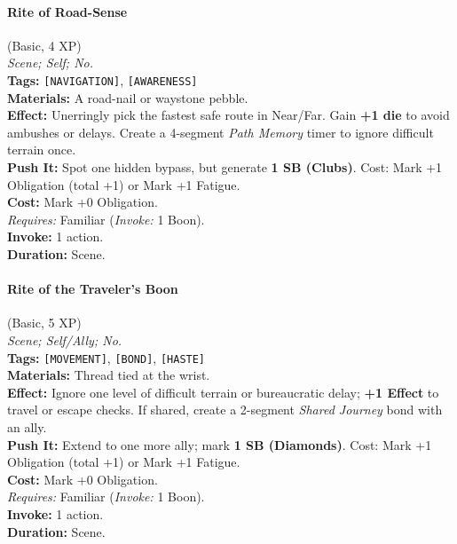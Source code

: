 \paragraph{Rite of Road-Sense} (Basic, 4 XP) \hfill \\
\emph{Scene; Self; No.} \\
\textbf{Tags:} \texttt{[NAVIGATION]}, \texttt{[AWARENESS]} \\
\textbf{Materials:} A road-nail or waystone pebble. \\
\textbf{Effect:} Unerringly pick the fastest safe route in Near/Far. Gain \textbf{+1 die} to avoid ambushes or delays. Create a 4-segment \textit{Path Memory} timer to ignore difficult terrain once. \\
\textbf{Push It:} Spot one hidden bypass, but generate \textbf{1 SB (Clubs)}. Cost: Mark +1 Obligation (total +1) or Mark +1 Fatigue. \\
\textbf{Cost:} Mark +0 Obligation. \\
\textit{Requires:} Familiar (\textit{Invoke:} 1 Boon). \\
\textbf{Invoke:} 1 action. \\
\textbf{Duration:} Scene.

\paragraph{Rite of the Traveler's Boon} (Basic, 5 XP) \hfill \\
\emph{Scene; Self/Ally; No.} \\
\textbf{Tags:} \texttt{[MOVEMENT]}, \texttt{[BOND]}, \texttt{[HASTE]} \\
\textbf{Materials:} Thread tied at the wrist. \\
\textbf{Effect:} Ignore one level of difficult terrain or bureaucratic delay; \textbf{+1 Effect} to travel or escape checks. If shared, create a 2-segment \textit{Shared Journey} bond with an ally. \\
\textbf{Push It:} Extend to one more ally; mark \textbf{1 SB (Diamonds)}. Cost: Mark +1 Obligation (total +1) or Mark +1 Fatigue. \\
\textbf{Cost:} Mark +0 Obligation. \\
\textit{Requires:} Familiar (\textit{Invoke:} 1 Boon). \\
\textbf{Invoke:} 1 action. \\
\textbf{Duration:} Scene.

